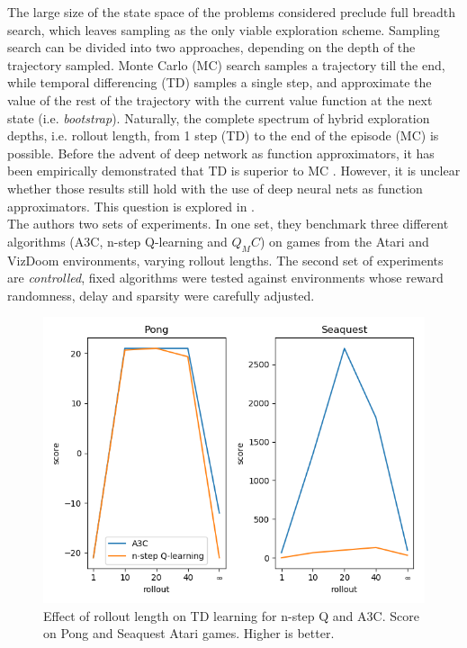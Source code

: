 \documentclass{article}
\begin{document}
The large size of the state space of the problems considered preclude full breadth
search, which leaves sampling as the only viable exploration scheme. Sampling
search can be divided into two approaches, depending on the depth of the trajectory
sampled. Monte Carlo (MC) search samples a trajectory till the end, while temporal
differencing (TD) samples a single step, and approximate the value of the rest of the
trajectory with the current value function at the next state (i.e. \emph{bootstrap}).
Naturally, the complete spectrum of hybrid exploration depths, i.e. rollout length,
from 1 step (TD) to the end of the episode (MC) is possible.
Before the advent of deep network as function approximators, it has been empirically
demonstrated that TD is superior to MC \citep{sutton1995}. However, it is unclear
whether those results still hold with the use of deep neural nets as function approximators.
This question is explored in \citep{amiranashvili2018analyzing}. \\

The authors two sets of experiments. In one set, they benchmark three different algorithms
(A3C, n-step Q-learning and $Q_MC$) on games from the Atari and VizDoom environments,
varying rollout lengths. The second set of experiments are \emph{controlled}, fixed algorithms
were tested against environments whose reward randomness, delay and sparsity were
carefully adjusted.\\

\begin{figure}[H]
    \centering
    \includegraphics[scale=0.75]{results}
    \caption{Effect of rollout length on TD learning for n-step Q and A3C. Score on
    Pong and Seaquest Atari games. Higher is better.}
    \label{rollouts}
\end{figure}
\end{document}
